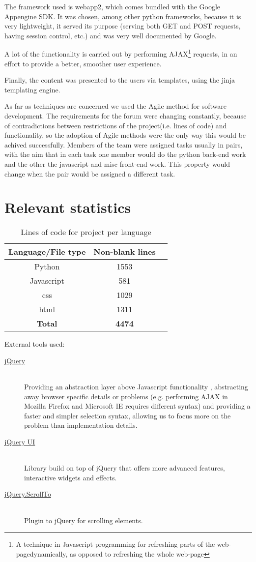 \documentclass[12pt,a4paper,titlepage]{article}
\begin{document}
The framework used is webapp2, which comes bundled with the Google Appengine SDK. It was chosen, among other python frameworks, because it is very lightweight, it served its purpose (serving both GET and POST requests, having session control, etc.) and was very well documented by Google. 

A lot of the functionality is carried out by performing AJAX\footnote{A technique in Javascript programming for refreshing parts of the web-pagedynamically, as opposed to refreshing the whole web-page}  requests, in an effort to provide a better, smoother user experience.

Finally, the content was presented to the users via templates, using the jinja templating engine.

As far as techniques are concerned we used the Agile method for software development. The requirements for the forum were changing constantly, because of contradictions between restrictions of the project(i.e. lines of code) and functionality, so the adoption of Agile methods were the only way this would be achived successfully. Members of the team were assigned tasks usually in pairs, with the aim that in each task one member would do the python back-end work and the other the javascript and misc front-end work. This property would change when the pair would be assigned a different task.
\section{Relevant statistics}
\begin{table}[!htbp]
\centering
\begin{tabular}{| c |c |c|}
\hline
\bf{Language/File type} & \bf{Non-blank lines}\\
\hline
Python & 1553\\
\hline
Javascript & 581 \\
\hline
css & 1029 \\
\hline
html & 1311\\
\hline
\bf{Total} & \bf{4474}\\
\hline
\end{tabular}
\caption{Lines of code for project per language}
\end{table}
External tools used:
\begin{description}
\item[\href{http://jquery.com/}{jQuery}]\hfill\\
Providing an abstraction layer above Javascript functionality , abstracting away browser specific details or problems (e.g. performing AJAX in Mozilla Firefox and Microsoft IE requires different syntax) and providing a faster and simpler selection syntax, allowing us to focus more on the problem than implementation details.
\item[\href{http://jqueryui.com/}{jQuery UI}]\hfill\\
Library build on top of jQuery that offers more advanced features, interactive widgets and effects.
\item[\href{http://flesler.blogspot.co.uk/2007/10/jqueryscrollto.html}{jQuery.ScrollTo}]\hfill\\
Plugin to jQuery for scrolling elements.
\end{description}
\newpage
\end{document}
